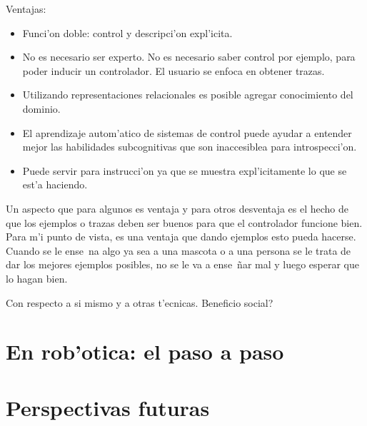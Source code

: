 \documentclass[11pt]{article}
\begin{document}
Ventajas:
\begin{itemize}
\item Funci'on doble: control y descripci'on expl'icita.
\item No es necesario ser experto. No es necesario saber control por ejemplo, para poder inducir un controlador. El usuario se enfoca en obtener trazas.
\item Utilizando representaciones relacionales es posible agregar conocimiento del dominio.
\item El aprendizaje autom'atico de sistemas de control puede ayudar a entender mejor las habilidades subcognitivas que son inaccesiblea para introspecci'on.
\item Puede servir para instrucci'on ya que se muestra expl'icitamente lo que se est'a haciendo.
\end{itemize}

Un aspecto que para algunos es ventaja y para otros desventaja es el hecho de que los ejemplos o trazas deben ser buenos para que el controlador funcione bien. Para m'i punto de vista, es una ventaja que dando ejemplos esto pueda hacerse. Cuando se le ense~na algo ya sea a una mascota o a una persona se le trata de dar los mejores ejemplos posibles, no se le va a ense~ñar mal y luego esperar que lo hagan bien. 

Con respecto a si mismo y a otras t'ecnicas. Beneficio social?
\section{En rob'otica: el paso a paso}
\section{Perspectivas futuras}



\end{document}
